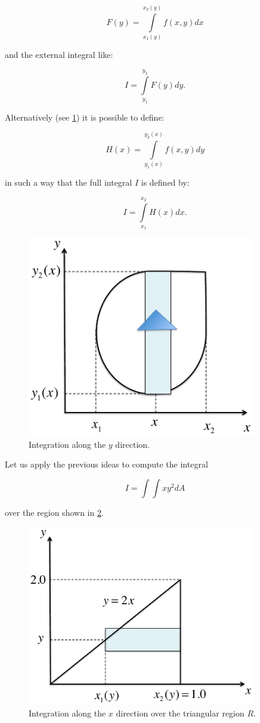 \[F(y) = \int\limits_{{x_1}(y)}^{{x_2}(y)} {f(x,y)dx} \]

and the external integral like:


\[I = \int\limits_{{y_1}}^{{y_2}} {F(y)dy}. \]


Alternatively (see \cref{fig:diry}) it is possible to define:


\[H(x) = \int\limits_{{y_1}(x)}^{{y_2}(x)} {f(x,y)dy} \]

in such a way that the full integral $I$ is defined by:

\[I = \int\limits_{{x_1}}^{{x_2}} {H(x)dx}. \]

\begin{figure}[H]
\centering
\includegraphics[width=10cm]{img/diry.pdf}
\caption{Integration along the $y$ direction.}
\label{fig:diry}
\end{figure}


Let us apply the previous ideas to compute the integral

\[I = \int {\int {x{y^2}} } dA\]

over the region shown in \cref{fig:ejeint}.



\begin{figure}[H]
\centering
\includegraphics[width=10cm]{img/ejeint.pdf}
\caption{Integration along the $x$ direction over the triangular region $R$.}
\label{fig:ejeint}
\end{figure}


